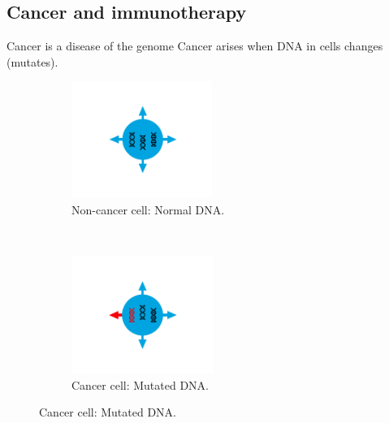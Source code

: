 \documentclass{beamer}
\begin{document}
\subsection{Cancer and immunotherapy}
\begin{frame}{Cancer is a disease of the genome}
Cancer arises when DNA in cells changes (mutates).
\begin{figure}[t!]
    \centering
    \begin{subfigure}[t]{0.45\textwidth}
        \centering
        \includegraphics[height=1.5in]{figures/IC1.png}
        \caption{Non-cancer cell: Normal DNA.}
    \end{subfigure}
    ~ 
    \begin{subfigure}[t]{0.45\textwidth}
        \centering
        \includegraphics[height=1.5in]{figures/IC2.png}
        \caption{Cancer cell: Mutated DNA.}
    \end{subfigure}
\end{figure}
\end{frame}
\end{document}
